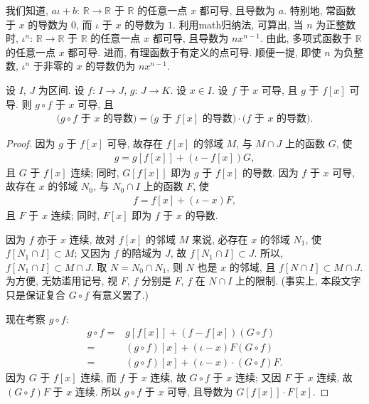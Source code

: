 \begin{example}
    我们知道,
    $a\iota + b$: $\mathbb{R} \to \mathbb{R}$
    于 $\mathbb{R}$ 的任意一点 $x$ 都可导, 且导数为 $a$.
    特别地,
    常函数于 $x$ 的导数为 $0$,
    而 $\iota$ 于 $x$ 的导数为 $1$.
    利用\gls{math}归纳法, 可算出,
    当 $n$ 为正整数时,
    $\iota^n$: $\mathbb{R} \to \mathbb{R}$
    于 $\mathbb{R}$ 的任意一点 $x$ 都可导,
    且导数为 $nx^{n-1}$.
    由此, 多项式函数于 $\mathbb{R}$ 的任意一点 $x$ 都可导.
    进而, 有理函数于有定义的点可导.
    顺便一提, 即使 $n$ 为负整数,
    $\iota^n$ 于非零的 $x$ 的导数仍为 $nx^{n-1}$.
\end{example}


\begin{theorem}[链规则]
    设 $I$, $J$ 为区间.
    设 $f$: $I \to J$, $g$: $J \to K$.
    设 $x \in I$.
    设 $f$ 于 $x$ 可导, 且 $g$ 于 $f[x]$ 可导.
    则 $g \circ f$ 于 $x$ 可导, 且
    \begin{align*}
        \text{($g \circ f$ 于 $x$ 的导数)} = \text{($g$ 于 $f[x]$ 的导数)} \cdot \text{($f$ 于 $x$ 的导数)}.
    \end{align*}
\end{theorem}

\begin{proof}
    因为 $g$ 于 $f[x]$ 可导,
    故存在 $f[x]$ 的邻域 $M$, 与 $M \cap J$ 上的函数 $G$,
    使
    \begin{align*}
        g = g[f[x]] + (\iota - f[x])G,
    \end{align*}
    且 $G$ 于 $f[x]$ 连续;
    同时, $G[f[x]]$ 即为 $g$ 于 $f[x]$ 的导数.
    因为 $f$ 于 $x$ 可导,
    故存在 $x$ 的邻域 $N_0$, 与 $N_0 \cap I$ 上的函数 $F$,
    使
    \begin{align*}
        f = f[x] + (\iota - x)F,
    \end{align*}
    且 $F$ 于 $x$ 连续;
    同时, $F[x]$ 即为 $f$ 于 $x$ 的导数.

    因为 $f$ 亦于 $x$ 连续,
    故对 $f[x]$ 的邻域 $M$ 来说,
    必存在 $x$ 的邻域 $N_1$, 使 $f[N_1 \cap I] \subset M$;
    又因为 $f$ 的陪域为 $J$,
    故 $f[N_1 \cap I] \subset J$.
    所以, $f[N_1 \cap I] \subset M \cap J$.
    取 $N = N_0 \cap N_1$, 则 $N$ 也是 $x$ 的邻域,
    且 $f[N \cap I] \subset M \cap J$.
    为方便, 无妨滥用记号,
    视 $F$, $f$ 分别是 $F$, $f$ 在 $N \cap I$ 上的限制.
    (事实上, 本段文字只是保证复合 $G \circ f$ 有意义罢了.)

    现在考察 $g \circ f$:
    \begin{align*}
        g \circ f
        = {} & g[f[x]] + (f - f[x])(G \circ f)                  \\
        = {} & (g \circ f)[x] + (\iota - x)F(G \circ f)         \\
        = {} & (g \circ f)[x] + (\iota - x) \cdot (G \circ f)F.
    \end{align*}
    因为 $G$ 于 $f[x]$ 连续, 而 $f$ 于 $x$ 连续,
    故 $G \circ f$ 于 $x$ 连续;
    又因 $F$ 于 $x$ 连续,
    故 $(G \circ f)F$ 于 $x$ 连续.
    所以 $g \circ f$ 于 $x$ 可导,
    且导数为 $G[f[x]] \cdot F[x]$.
\end{proof}

